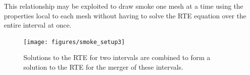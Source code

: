This relationship may be exploited to draw smoke one mesh at a time using the properties local to each mesh without having to solve the RTE equation over the entire interval at once.

\begin{figure}[\figoptions]
\begin{center}
\texttt{[image: figures/smoke\_setup3]}
\end{center}
\caption {Solutions to the RTE for two intervals are combined to form a solution to the RTE
for the merger of these intervals.
}
\label{figsmokesetup3}
\end{figure}
